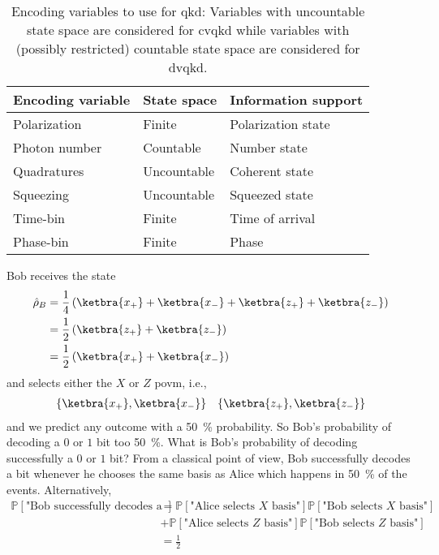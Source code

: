 \begin{table}[htb]
	\centering
	\begin{tabular}{lll}
		\toprule
		Encoding variable & State space & Information support \\
		\midrule
		Polarization & Finite & Polarization state \\
		Photon number & Countable & Number state \\
		Quadratures & Uncountable & Coherent state \\
		Squeezing & Uncountable & Squeezed state \\
		Time-bin & Finite & Time of arrival \\
		Phase-bin & Finite & Phase \\
		\bottomrule
	\end{tabular}
	\caption{Encoding variables to use for \gls{qkd}: Variables with uncountable state space are considered for \gls{cvqkd} while variables with (possibly restricted) countable state space are considered for \gls{dvqkd}.}
\end{table}

Bob receives the state
\begin{equation*}
	\begin{split}
		\hat\rho_B
		&=
		\frac{1}{4}
		\left(
			\ketbra{x_+}
			+
			\ketbra{x_-}
			+
			\ketbra{z_+}
			+
			\ketbra{z_-}
		\right)
		\\
		&=
		\frac{1}{2}
		\left(
			\ketbra{z_+}
			+
			\ketbra{z_-}
		\right)
		\\
		&=
		\frac{1}{2}
		\left(
			\ketbra{x_+}
			+
			\ketbra{x_-}
		\right)
	\end{split}
\end{equation*}
and selects either the $X$ or $Z$ \gls{povm}, i.e.,
\begin{align}
	\left\{
		\ketbra{x_+},
		\ketbra{x_-}
	\right\}
	&&
	\left\{
		\ketbra{z_+},
		\ketbra{z_-}
	\right\}
\end{align}
and we predict any outcome with a \SI{50}{\percent} probability.
So Bob's probability of decoding a $0$ or $1$ bit too \SI{50}{\percent}.
What is Bob's probability of decoding successfully a $0$ or $1$ bit?
From a classical point of view, Bob successfully decodes a bit whenever he chooses the same basis as Alice which happens in \SI{50}{\percent} of the events.
Alternatively,
\begin{equation}
	\begin{split}
		\mathbb{P}\left[\text{"Bob successfully decodes a bit"}\right]
		&=
		\mathbb{P}\left[\text{"Alice selects $X$ basis"}\right]
		\mathbb{P}\left[\text{"Bob selects $X$ basis"}\right]
		\\
		&+
		\mathbb{P}\left[\text{"Alice selects $Z$ basis"}\right]
		\mathbb{P}\left[\text{"Bob selects $Z$ basis"}\right]
		\\
		&=
		\frac{1}{2}
	\end{split}
\end{equation}